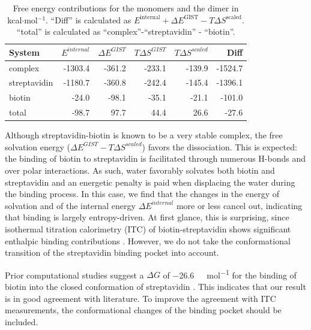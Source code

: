 \documentclass[9pt,tutorial,pubversion]{livecoms}
\begin{document}
\begin{table}[h]
	\caption{Free energy contributions for the monomers and the dimer in kcal$\cdot$mol$^{-1}$. ``Diff'' is calculated as 
	$E^\text{internal} + \Delta E^\text{GIST} - T\Delta S^\text{scaled}$. ``total'' is calculated as 
	``complex''-``streptavidin'' - ``biotin''.}\label{tab_dg_monomers_dimer}
	\small
	\begin{tabular}{@{}lrrrrr@{}}
		\toprule
		System       & $E^{internal}$ & $\Delta E^\textit{GIST}$ & $T\Delta S^\textit{GIST}$ & $T\Delta S^\textit{scaled}$ & Diff \\
		\midrule
		complex      & -1303.4 & -361.2 & -233.1 & -139.9 & -1524.7 \\
		streptavidin & -1180.7 & -360.8 & -242.4 & -145.4 & -1396.1 \\
		biotin       & -24.0   &  -98.1 &  -35.1 &  -21.1 &  -101.0 \\
		\midrule
		total         & -98.7   &   97.7 &   44.4 &   26.6 &   -27.6 \\
		\bottomrule
	\end{tabular}
\end{table}
Although streptavidin-biotin is known to be a very stable complex, the free solvation energy ($\Delta E^{GIST}-T\Delta S^{scaled}$) favors the dissociation.
This is expected: the binding of biotin to streptavidin is facilitated through numerous H-bonds and over polar interactions. 
As such, water favorably solvates both biotin and streptavidin and an energetic penalty is paid when displacing the water during the binding process. 
In this case, we find that the changes in the energy of solvation and of the internal energy $\Delta E^{internal}$ more or less cancel out, indicating that binding is largely entropy-driven.
At first glance, this is surprising, since isothermal titration calorimetry (ITC) of biotin-streptavidin shows significant enthalpic binding contributions \cite{mpye2020-biotin-itc,hyre2006-biotin-itc}.
However, we do not take the conformational transition of the streptavidin binding pocket into account.

Prior computational studies suggest a $\Delta G$ of \qty{-26.6}{\kilo\calorie\per\mole} for the binding of biotin into the closed conformation of streptavidin \cite{Bansal2018-biotin}.
This indicates that our result is in good agreement with literature.
To improve the agreement with ITC measurements, the conformational changes of the binding pocket should be included.
\end{document}
